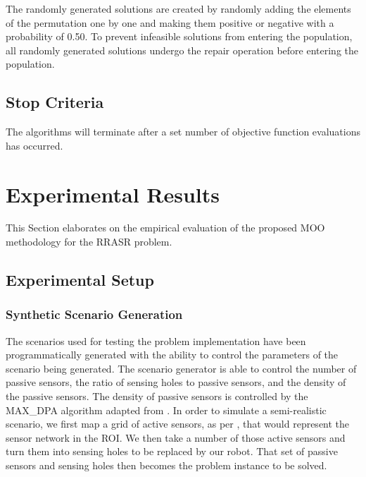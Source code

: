 \documentclass[conference]{IEEEtran}
\begin{document}
The randomly generated solutions are created by randomly adding the elements of the permutation one by one and making them positive or negative with a probability of 0.50. To prevent infeasible solutions from entering the population, all randomly generated solutions undergo the repair operation before entering the population.

\subsection{Stop Criteria}
\label{sec:Algorithms:StopCriteria}
The algorithms will terminate after a set number of objective function evaluations has occurred.



\section{Experimental Results}
\label{sec:Experiments}

This Section elaborates on the empirical evaluation of the proposed MOO methodology for the RRASR problem.

\subsection{Experimental Setup}
\label{sec:Experiments:Setup:Scenarios}

\subsubsection{Synthetic Scenario Generation}
\label{sec:Experiments:Scenarios}

The scenarios used for testing the problem implementation have been programmatically generated with the ability to control the parameters of the scenario being generated. The scenario generator is able to control the number of passive sensors, the ratio of sensing holes to passive sensors, and the density of the passive sensors. The density of passive sensors is controlled by the  MAX\_DPA algorithm adapted from \cite{onat2008generating}. In order to simulate a semi-realistic scenario, we first map a grid of active sensors, as per \cite{fletcher2010back}\cite{li2014placing}, that would represent the sensor network in the ROI. We then take a number of those active sensors and turn them into sensing holes to be replaced by our robot. That set of passive sensors and sensing holes then becomes the problem instance to be solved.
\end{document}
